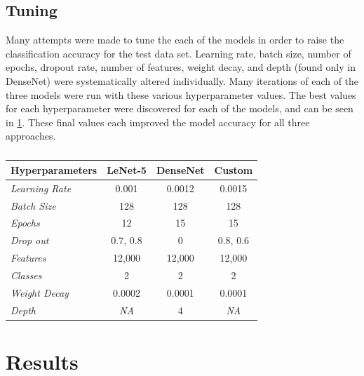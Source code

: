 \documentclass[manuscript,screen,review]{acmart}
\begin{document}
\subsection{Tuning}

Many attempts were made to tune the each of the models in order to raise the classification accuracy for the test data set. Learning rate, batch size, number of epochs, dropout rate, number of features, weight decay, and depth (found only in DenseNet) were systematically altered individually. Many iterations of each of the three models were run with these various hyperparameter values. The best values for each hyperparameter were discovered for each of the models, and can be seen in \cref{tab:params}. These final values each improved the model accuracy for all three approaches.

\begin{table}[h!]
\caption{}
  \label{tab:params}
  \begin{tabular}{lccc}
    \textbf{Hyperparameters} & LeNet-5 & DenseNet & Custom \\
    \toprule
    \textit{Learning Rate} & 0.001 & 0.0012 & 0.0015  \\
    \textit{Batch Size} & 128 & 128 & 128\\
    \textit{Epochs} & 12 & 15 & 15 \\
    \textit{Drop out} & 0.7, 0.8 & 0 & 0.8, 0.6 \\
    \textit{Features} & 12,000 & 12,000 & 12,000 \\
    \textit{Classes} & 2 & 2 & 2  \\
    \textit{Weight Decay} & 0.0002 & 0.0001 &  0.0001 \\
    \textit{Depth} & \textit{NA} & 4 & \textit{NA} \\
    \bottomrule
\end{tabular}
\end{table}

\section{Results}
\end{document}

